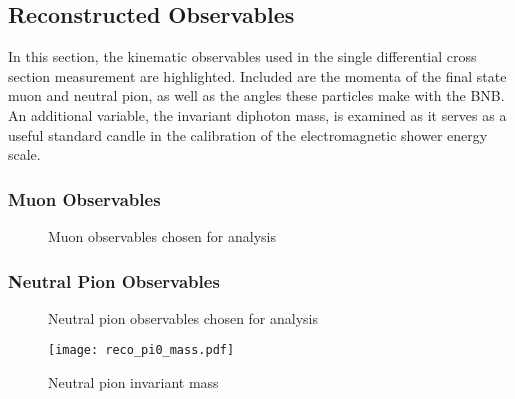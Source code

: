 \documentclass[../main.tex]{subfiles}
\begin{document}
\subsection{Reconstructed Observables}
\label{subsec:vars}
In this section, the kinematic observables used in the single differential cross section measurement are highlighted.  Included are the momenta of the final state muon and neutral pion, as well as the angles these particles make with the BNB.  An additional variable, the invariant diphoton mass, is examined as it serves as a useful standard candle in the calibration of the electromagnetic shower energy scale.

\subsubsection{Muon Observables}
\begin{figure}[H]
    \center
    \caption{Muon observables chosen for analysis}
    \label{fig:reco_muon_observables}
\end{figure}

\subsubsection{Neutral Pion Observables}
\begin{figure}[H]
    \center
    \caption{Neutral pion observables chosen for analysis}
    \label{fig:reco_pi0_observables}
\end{figure}

\begin{figure}[H]
    \center
    \texttt{[image: reco\_pi0\_mass.pdf]}
    \caption[text]{Neutral pion invariant mass}
    \label{fig:reco_pi0_mass}
\end{figure}
\end{document}
